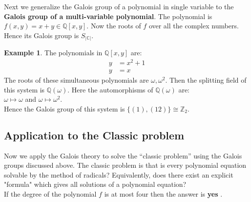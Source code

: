 \documentclass[a4paper,twoside,10pt]{article}
\theoremstyle{plain}
\theoremstyle{definition}
\newtheorem{example}[theorem]{Example}
\begin{document}
\vspace{5mm}
\noindent
Next we generalize the Galois group of a polynomial in single variable to the \textbf{Galois group of a multi-variable polynomial}. The polynomial is \(f(x,y)=x+y \in \mathbb{Q}[x,y]\). Now the roots of \(f\) over all the complex numbers. Hence its Galois group is \(S_{|\mathbb{C}|}\).
\begin{example}
  The polynomials in \(\mathbb{Q}[x,y]\) are:
  \begin{align}
    y &= x^2+1 \\
    y &=x
  \end{align}
  The roots of these simultaneous polynomials are \(\omega, {\omega}^2\). Then the splitting field of this system is \(\mathbb{Q}(\omega)\). Here the automorphisms of \(\mathbb{Q}(\omega)\) are: \\
  \(\omega \longmapsto \omega\) and \hspace{9mm} \(\omega \longmapsto {\omega}^2\).\\
  Hence the Galois group of this system is \(\{(1), (12)\} \cong {\mathbb{Z}}_2\).
\end{example}

\subsection{Application to the Classic problem}
Now we apply the Galois theory to solve the ``classic problem'' using the Galois groups discussed above.  The classic problem is that is every polynomial equation solvable by the method of radicals? Equivalently, does there exist an explicit "formula" which gives all solutions of a polynomial equation? \\If the degree of  the polynomial \(f\) is at most four then the answer is \textbf{yes} \cite{hunger}.\\
\end{document}
